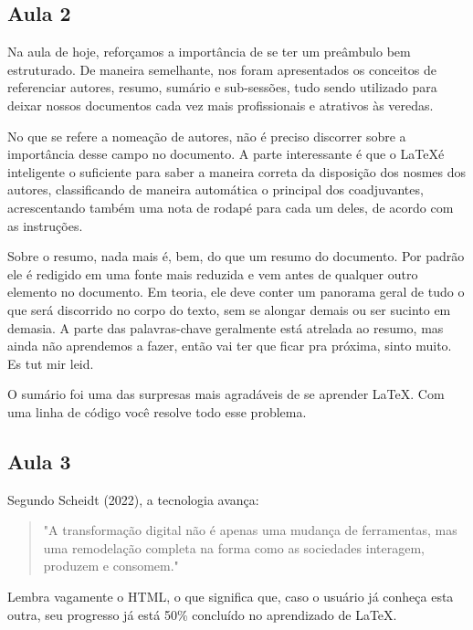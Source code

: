 \documentclass[12pt, a4paper, twocolumn] {article} %
\begin{document}

\subsection{Aula 2}
Na aula de hoje, reforçamos a importância de se ter um preâmbulo bem estruturado. De maneira semelhante, nos foram apresentados os conceitos de referenciar autores, resumo, sumário e sub-sessões, tudo sendo utilizado para deixar nossos documentos cada vez mais profissionais e atrativos às veredas.


No que se refere a nomeação de autores, não é preciso discorrer sobre a importância desse campo no documento. A parte interessante é que o \LaTeX é inteligente o suficiente para saber a maneira correta da disposição dos nosmes dos autores, classificando de maneira automática o principal dos coadjuvantes, acrescentando também uma nota de rodapé para cada um deles, de acordo com as instruções.

Sobre o resumo, nada mais é, bem, do que um resumo do documento. Por padrão ele é redigido em uma fonte mais reduzida e vem antes de qualquer outro elemento no documento. Em teoria, ele deve conter um panorama geral de tudo o que será discorrido no corpo do texto, sem se alongar demais ou ser sucinto em demasia. A parte das palavras-chave geralmente está atrelada ao resumo, mas ainda não aprendemos a fazer, então vai ter que ficar pra próxima, sinto muito. Es tut mir leid.

O sumário foi uma das surpresas mais agradáveis de se aprender LaTeX. Com uma linha de código você resolve todo esse problema.

\subsection{Aula 3}
Segundo Scheidt (2022), a tecnologia avança:
\begin{quote} %
    \singlespacing %
    \small %
    "A transformação digital não é apenas uma mudança de ferramentas, mas uma remodelação completa na forma como as sociedades interagem, produzem e consomem."    
\end{quote} %

Lembra vagamente o HTML, o que significa que, caso o usuário já conheça esta outra, seu progresso já está 50\% concluído no aprendizado de LaTeX.
\end{document}
